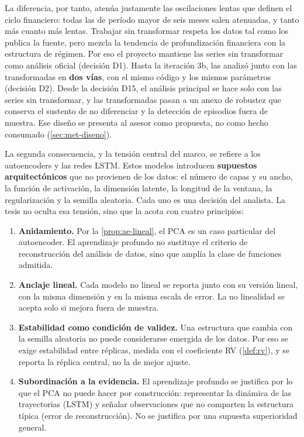 La diferencia, por tanto, atenúa justamente las oscilaciones lentas que definen el ciclo
financiero: todas las de período mayor de seis meses salen atenuadas, y tanto más cuanto más
lentas. Trabajar sin transformar respeta los datos tal como los publica la fuente, pero mezcla la
tendencia de profundización financiera con la estructura de régimen. Por eso el proyecto mantiene
las series sin transformar como análisis oficial (decisión D1). Hasta la iteración 3b, las analizó
junto con las transformadas en \textbf{dos vías}, con el mismo código y los mismos parámetros
(decisión D2). Desde la decisión D15, el análisis principal se hace solo con las series sin
transformar, y las transformadas pasan a un anexo de robustez que conserva el sustento de no
diferenciar y la detección de episodios fuera de muestra. Ese diseño se presenta al asesor como
propuesta, no como hecho consumado (\cref{sec:met-diseno}).

La segunda consecuencia, y la tensión central del marco, se refiere a los autoencoders y las
redes LSTM. Estos modelos introducen \textbf{supuestos arquitectónicos} que no provienen de los
datos: el número de capas y su ancho, la función de activación, la dimensión latente, la longitud
de la ventana, la regularización y la semilla aleatoria. Cada uno es una decisión del analista.
La tesis no oculta esa tensión, sino que la acota con cuatro principios:

\begin{enumerate}[leftmargin=*]
  \item \textbf{Anidamiento.} Por la \cref{prop:ae-lineal}, el PCA es un caso particular del
    autoencoder. El aprendizaje profundo no sustituye el criterio de reconstrucción del análisis
    de datos, sino que amplía la clase de funciones admitida.
  \item \textbf{Anclaje lineal.} Cada modelo no lineal se reporta junto con su versión lineal,
    con la misma dimensión y en la misma escala de error. La no linealidad se acepta solo si
    mejora fuera de muestra.
  \item \textbf{Estabilidad como condición de validez.} Una estructura que cambia con la semilla
    aleatoria no puede considerarse emergida de los datos. Por eso se exige estabilidad entre
    réplicas, medida con el coeficiente RV (\cref{def:rv}), y se reporta la réplica central, no
    la de mejor ajuste.
  \item \textbf{Subordinación a la evidencia.} El aprendizaje profundo se justifica por lo que el
    PCA no puede hacer por construcción: representar la dinámica de las trayectorias (LSTM) y
    señalar observaciones que no comparten la estructura típica (error de reconstrucción). No se
    justifica por una supuesta superioridad general.
\end{enumerate}

